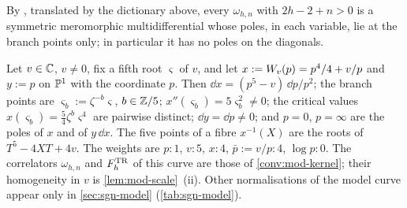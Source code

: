 By \cite[Thm.~4.2, Thm.~4.6]{Eynard:2007kz}, translated by the dictionary above, every $\omega_{h,n}$ with $2h-2+n>0$ is a symmetric meromorphic multidifferential whose poles, in each variable, lie at the branch points only; in particular it has no poles on the diagonals.

\begin{defn}
\label{def:mod-curve}
Let $v\in\mathbb{C}$, $v\neq 0$, fix a fifth root $\varsigma$ of $v$, and let $x:=W_{v}(p)=p^4/4+v/p$ and $y:=p$ on $\mathbb{P}^1$ with the coordinate $p$. Then $\dd x=(p^5-v)\,\dd p/p^2$; the branch points are $\varsigma_b:=\zeta^{-b}\varsigma$, $b\in\mathbb{Z}/5$; $x''(\varsigma_b)=5\varsigma_b^2\neq 0$; the critical values $x(\varsigma_b)=\frac54\zeta^b\varsigma^4$ are pairwise distinct; $\dd y=\dd p\neq 0$; and $p=0$, $p=\infty$ are the poles of $x$ and of $y\,\dd x$. The five points of a fibre $x^{-1}(X)$ are the roots of $T^5-4XT+4v$. The weights are $p:1$, $v:5$, $x:4$, $\bar p:=v/p:4$, $\log p:0$. The correlators $\omega_{h,n}$ and $F^{\mathrm{TR}}_h$ of this curve are those of \cref{conv:mod-kernel}; their homogeneity in $v$ is \cref{lem:mod-scale}~(ii). Other normalisations of the model curve appear only in \cref{sec:sgn-model} (\cref{tab:sgn-model}).
\end{defn}


